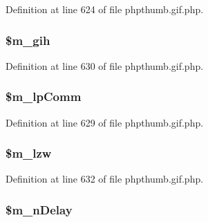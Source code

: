 \-Definition at line 624 of file phpthumb.\-gif.\-php.

\hypertarget{class_c_g_i_f_i_m_a_g_e_a1b85f381b7c0755a13e146611890c96f}{
\subsubsection[{\$m\-\_\-gih}]{\setlength{\rightskip}{0pt plus 5cm}\$m\-\_\-gih}}\label{class_c_g_i_f_i_m_a_g_e_a1b85f381b7c0755a13e146611890c96f}


\-Definition at line 630 of file phpthumb.\-gif.\-php.

\hypertarget{class_c_g_i_f_i_m_a_g_e_a2ec1ee850534eaf0be7521e963c66f90}{
\subsubsection[{\$m\-\_\-lp\-Comm}]{\setlength{\rightskip}{0pt plus 5cm}\$m\-\_\-lp\-Comm}}\label{class_c_g_i_f_i_m_a_g_e_a2ec1ee850534eaf0be7521e963c66f90}


\-Definition at line 629 of file phpthumb.\-gif.\-php.

\hypertarget{class_c_g_i_f_i_m_a_g_e_a0c0944d78ee95a2a837ae8f3441882ce}{
\subsubsection[{\$m\-\_\-lzw}]{\setlength{\rightskip}{0pt plus 5cm}\$m\-\_\-lzw}}\label{class_c_g_i_f_i_m_a_g_e_a0c0944d78ee95a2a837ae8f3441882ce}


\-Definition at line 632 of file phpthumb.\-gif.\-php.

\hypertarget{class_c_g_i_f_i_m_a_g_e_a67a880e8d176d96e08fcf0583c96308c}{
\subsubsection[{\$m\-\_\-n\-Delay}]{\setlength{\rightskip}{0pt plus 5cm}\$m\-\_\-n\-Delay}}\label{class_c_g_i_f_i_m_a_g_e_a67a880e8d176d96e08fcf0583c96308c}


